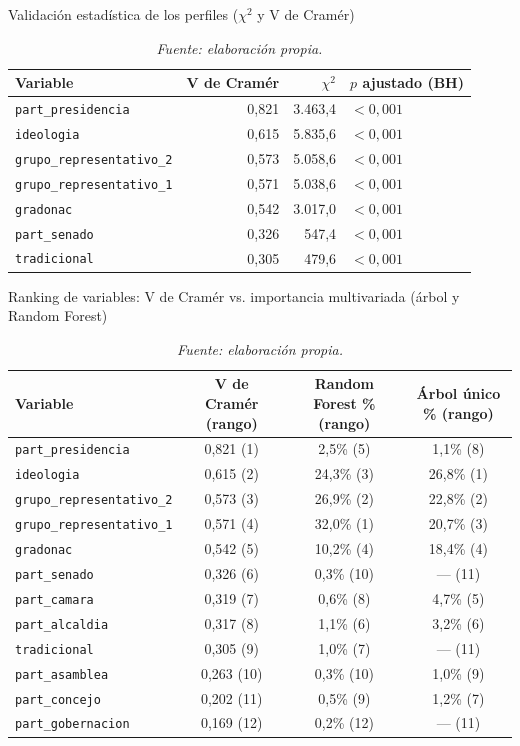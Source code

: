 \documentclass[11pt,letterpaper]{article}
\newcommand{\code}[1]{\texttt{\small #1}}
\begin{document}
\begin{table}[htbp]
\centering
\small
\caption{Validación estadística de los perfiles ($\chi^2$ y V de Cramér)}
\label{tab:A6}
\begin{tabular}{@{}lrrl@{}}
\toprule
Variable & V de Cramér & $\chi^2$ & $p$ ajustado (BH) \\
\midrule
\code{part\_presidencia} & 0,821 & 3.463,4 & $<0,001$ \\
\code{ideologia} & 0,615 & 5.835,6 & $<0,001$ \\
\code{grupo\_re\-pre\-sen\-ta\-ti\-vo\_2} & 0,573 & 5.058,6 & $<0,001$ \\
\code{grupo\_re\-pre\-sen\-ta\-ti\-vo\_1} & 0,571 & 5.038,6 & $<0,001$ \\
\code{gradonac} & 0,542 & 3.017,0 & $<0,001$ \\
\code{part\_senado} & 0,326 & 547,4 & $<0,001$ \\
\code{tradicional} & 0,305 & 479,6 & $<0,001$ \\
\bottomrule
\end{tabular}
\vspace{0.3em}
\caption*{\footnotesize\color{mutedgray}\itshape Fuente: elaboración propia.}
\end{table}

\begin{table}[htbp]
\centering
\small
\caption{Ranking de variables: V de Cramér vs. importancia multivariada (árbol y Random Forest)}
\label{tab:A7}
\begin{tabular}{@{}lccc@{}}
\toprule
Variable & V de Cramér (rango) & Random Forest \% (rango) & Árbol único \% (rango) \\
\midrule
\code{part\_presidencia} & 0,821 (1) & 2,5\% (5) & 1,1\% (8) \\
\code{ideologia} & 0,615 (2) & 24,3\% (3) & 26,8\% (1) \\
\code{grupo\_re\-pre\-sen\-ta\-ti\-vo\_2} & 0,573 (3) & 26,9\% (2) & 22,8\% (2) \\
\code{grupo\_re\-pre\-sen\-ta\-ti\-vo\_1} & 0,571 (4) & 32,0\% (1) & 20,7\% (3) \\
\code{gradonac} & 0,542 (5) & 10,2\% (4) & 18,4\% (4) \\
\code{part\_senado} & 0,326 (6) & 0,3\% (10) & --- (11) \\
\code{part\_camara} & 0,319 (7) & 0,6\% (8) & 4,7\% (5) \\
\code{part\_alcaldia} & 0,317 (8) & 1,1\% (6) & 3,2\% (6) \\
\code{tradicional} & 0,305 (9) & 1,0\% (7) & --- (11) \\
\code{part\_asamblea} & 0,263 (10) & 0,3\% (10) & 1,0\% (9) \\
\code{part\_concejo} & 0,202 (11) & 0,5\% (9) & 1,2\% (7) \\
\code{part\_gobernacion} & 0,169 (12) & 0,2\% (12) & --- (11) \\
\bottomrule
\end{tabular}
\vspace{0.3em}
\caption*{\footnotesize\color{mutedgray}\itshape Fuente: elaboración propia.}
\end{table}
\end{document}
